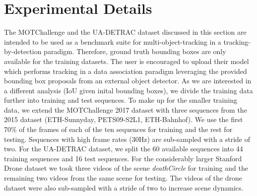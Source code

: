 \section{Experimental Details}
\label{sec:mohart_experimental_details}
The MOTChallenge and the UA-DETRAC dataset discussed in this section are intended to be used as a benchmark suite for multi-object-tracking in a tracking-by-detection paradigm. Therefore, ground truth bounding boxes are only available for the training datasets. The user is encouraged to upload their model which performs tracking in a data association paradigm leveraging the provided bounding box proposals from an external object detector. As we are interested in a different analysis (IoU given inital bounding boxes), we divide the training data further into training and test sequences. To make up for the smaller training data, we extend the MOTChallenge 2017 dataset with three sequences from the 2015 dataset (ETH-Sunnyday, PETS09-S2L1, ETH-Bahnhof). We use the first 70\% of the frames of each of the ten sequences for training and the rest for testing. Sequences with high frame rates (30Hz) are sub-sampled with a stride of two. For the UA-DETRAC dataset, we split the 60 available sequences into 44 training sequences and 16 test sequences. For the considerably larger Stanford Drone dataset we took three videos of the scene \textit{deathCircle} for training and the remaining two videos from the same scene for testing. The videos of the drone dataset were also sub-sampled with a stride of two to increase scene dynamics.

